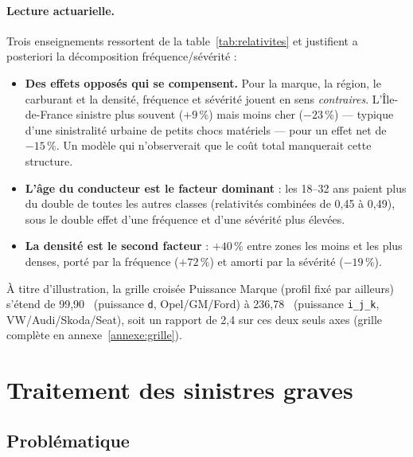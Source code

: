 \documentclass[11pt,a4paper]{article}
\newcommand{\eur}{\texteuro}
\begin{document}
\paragraph{Lecture actuarielle.} Trois enseignements ressortent de la table~\ref{tab:relativites} et justifient a posteriori la décomposition fréquence/sévérité :

\begin{itemize}
    \item \textbf{Des effets opposés qui se compensent.} Pour la marque, la région, le carburant et la densité, fréquence et sévérité jouent en sens \emph{contraires}. L'Île-de-France sinistre plus souvent ($+9\,\%$) mais moins cher ($-23\,\%$) --- typique d'une sinistralité urbaine de petits chocs matériels --- pour un effet net de $-15\,\%$. Un modèle qui n'observerait que le coût total manquerait cette structure.
    \item \textbf{L'âge du conducteur est le facteur dominant} : les 18--32 ans paient plus du double de toutes les autres classes (relativités combinées de 0{,}45 à 0{,}49), sous le double effet d'une fréquence et d'une sévérité plus élevées.
    \item \textbf{La densité est le second facteur} : $+40\,\%$ entre zones les moins et les plus denses, porté par la fréquence ($+72\,\%$) et amorti par la sévérité ($-19\,\%$).
\end{itemize}

À titre d'illustration, la grille croisée Puissance \texttimes{} Marque (profil fixé par ailleurs) s'étend de 99{,}90~\eur{} (puissance \texttt{d}, Opel/GM/Ford) à 236{,}78~\eur{} (puissance \texttt{i\_j\_k}, VW/Audi/Skoda/Seat), soit un rapport de 2{,}4 sur ces deux seuls axes (grille complète en annexe~\ref{annexe:grille}).

\section{Traitement des sinistres graves}
\label{sec:graves}

\subsection{Problématique}
\end{document}
